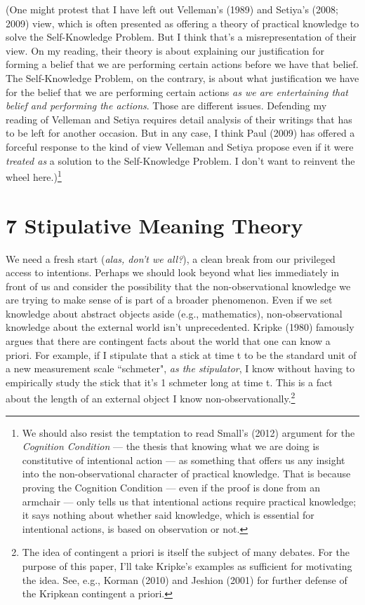 \documentclass[a4paper,12pt]{article}
\begin{document}
(One might protest that I have left out Velleman's (1989) and Setiya's (2008; 2009) view, which is often presented as offering a theory of practical knowledge to solve the Self-Knowledge Problem. But I think that's a misrepresentation of their view. On my reading, their theory is about explaining our justification for forming a belief that we are performing certain actions before we have that belief. The Self-Knowledge Problem, on the contrary, is about what justification we have for the belief that we are performing certain actions \emph{as we are entertaining that belief and performing the actions}. Those are different issues. Defending my reading of Velleman and Setiya requires detail analysis of their writings that has to be left for another occasion. But in any case, I think Paul (2009) has offered a forceful response to the kind of view Velleman and Setiya propose even if it were \emph{treated as} a solution to the Self-Knowledge Problem. I don't want to reinvent the wheel here.)\footnote{We should also resist the temptation to read Small's (2012) argument for the \emph{Cognition Condition} --- the thesis that knowing what we are doing is constitutive of intentional action --- as something that offers us any insight into the non-observational character of practical knowledge. That is because proving the Cognition Condition --- even if the proof is done from an armchair --- only tells us that intentional actions require practical knowledge; it says nothing about whether said knowledge, which is essential for intentional actions, is based on observation or not.}

\section*{7 Stipulative Meaning Theory}

We need a fresh start (\emph{alas, don't we all?}), a clean break from our privileged access to intentions. Perhaps we should look beyond what lies immediately in front of us and consider the possibility that the non-observational knowledge we are trying to make sense of is part of a broader phenomenon. Even if we set knowledge about abstract objects aside (e.g., mathematics), non-observational knowledge about the external world isn't unprecedented. Kripke (1980) famously argues that there are contingent facts about the world that one can know a priori. For example, if I stipulate that a stick at time t to be the standard unit of a new measurement scale ``schmeter", \emph{as the stipulator}, I know without having to empirically study the stick that it's 1 schmeter long at time t. This is a fact about the length of an external object I know non-observationally.\footnote{The idea of contingent a priori is itself the subject of many debates. For the purpose of this paper, I'll take Kripke's examples as sufficient for motivating the idea. See, e.g., Korman (2010) and Jeshion (2001) for further defense of the Kripkean contingent a priori.}
\end{document}
